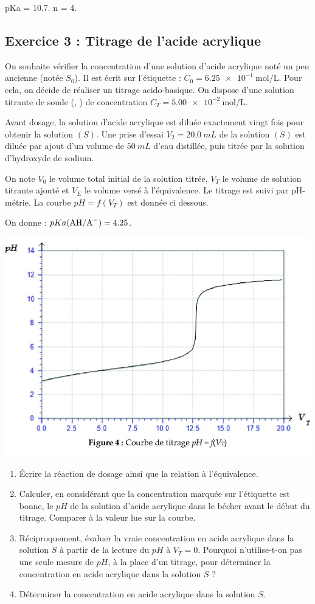 pKa = 10.7. n = 4.

\subsection{Exercice 3 : Titrage de l'acide acrylique}

On souhaite vérifier la concentration d'une solution d'acide acrylique noté  un peu ancienne (notée $S_0$). Il est écrit sur l'étiquette : $C_0 = \SI{6.25e-1}{\mol\per\liter}$. Pour cela, on décide de réaliser un titrage acido-basique.
On dispose d'une solution titrante de soude (, ) de concentration $C_T = \SI{5.00e-2}{\mol\per\liter}$.

Avant dosage, la solution d'acide acrylique est diluée exactement vingt fois pour obtenir la solution $(S)$. Une prise d'essai $V_2 = \SI{20.0}{mL}$ de la solution $(S)$ est diluée par ajout d'un volume de $\SI{50}{mL}$ d'eau distillée, puis titrée par la solution  d'hydroxyde de sodium.

On note $V_0$ le volume total initial de la solution titrée, $V_T$ le volume de solution titrante ajouté et $V_E$ le volume versé à l’équivalence. Le titrage est suivi par pH-métrie. La courbe $pH = f(V_T)$  est donnée ci dessous.

On donne : $pKa(\ce{AH}/\ce{A-}) = 4.25$.

\includegraphics[width=\textwidth]{./Images/mpsi_s18_ex03.png}

\begin{enumerate}
	\item Écrire la réaction de dosage ainsi que la relation à l'équivalence.
	\item Calculer, en considérant que la concentration marquée sur l'étiquette est bonne, le $pH$ de la solution d'acide acrylique dans le bécher avant le début du titrage. Comparer à la valeur lue sur la courbe.
	\item Réciproquement, évaluer la vraie concentration en acide acrylique dans la solution $S$ à partir de la lecture du $pH$ à $V_T = 0$. Pourquoi n'utilise-t-on pas une seule mesure de $pH$, à la place d'un titrage, pour déterminer la concentration en acide acrylique dans la solution $S$ ?
	\item Déterminer la concentration en acide acrylique dans la solution $S$.
\end{enumerate}
